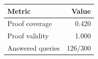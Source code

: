 \begin{tabular}{lr}
\toprule
Metric & Value \\
\midrule
Proof coverage & 0.420 \\
Proof validity & 1.000 \\
Answered queries & 126/300 \\
\bottomrule
\end{tabular}
